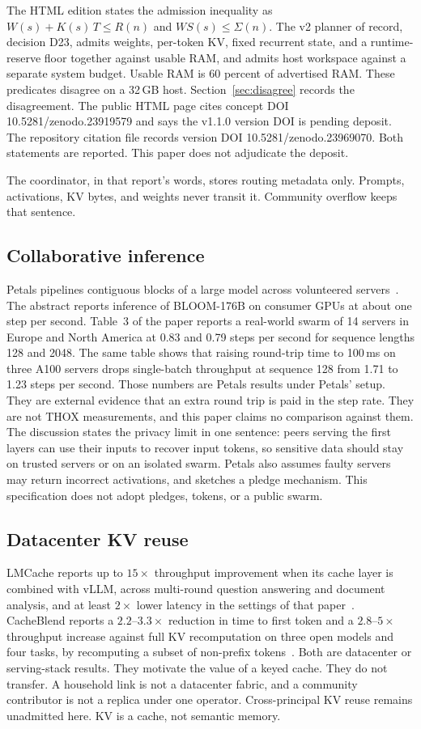 \documentclass[11pt]{article}
\begin{document}
The HTML edition states the admission inequality as \(W(s)+K(s)\,T \le R(n)\) and \(WS(s)\le \Sigma(n)\). The v2 planner of record, decision D23, admits weights, per-token KV, fixed recurrent state, and a runtime-reserve floor together against usable RAM, and admits host workspace against a separate system budget. Usable RAM is 60 percent of advertised RAM. These predicates disagree on a 32\,GB host. Section~\ref{sec:disagree} records the disagreement. The public HTML page cites concept DOI 10.5281/zenodo.23919579 and says the v1.1.0 version DOI is pending deposit. The repository citation file records version DOI 10.5281/zenodo.23969070. Both statements are reported. This paper does not adjudicate the deposit.

The coordinator, in that report's words, stores routing metadata only. Prompts, activations, KV bytes, and weights never transit it. Community overflow keeps that sentence.

\subsection{Collaborative inference}
Petals pipelines contiguous blocks of a large model across volunteered servers~\cite{petals}. The abstract reports inference of BLOOM-176B on consumer GPUs at about one step per second. Table~3 of the paper reports a real-world swarm of 14 servers in Europe and North America at 0.83 and 0.79 steps per second for sequence lengths 128 and 2048. The same table shows that raising round-trip time to 100\,ms on three A100 servers drops single-batch throughput at sequence 128 from 1.71 to 1.23 steps per second. Those numbers are Petals results under Petals' setup. They are external evidence that an extra round trip is paid in the step rate. They are not THOX measurements, and this paper claims no comparison against them. The discussion states the privacy limit in one sentence: peers serving the first layers can use their inputs to recover input tokens, so sensitive data should stay on trusted servers or on an isolated swarm. Petals also assumes faulty servers may return incorrect activations, and sketches a pledge mechanism. This specification does not adopt pledges, tokens, or a public swarm.

\subsection{Datacenter KV reuse}
LMCache reports up to \(15\times\) throughput improvement when its cache layer is combined with vLLM, across multi-round question answering and document analysis, and at least \(2\times\) lower latency in the settings of that paper~\cite{lmcache}. CacheBlend reports a \(2.2\)--\(3.3\times\) reduction in time to first token and a \(2.8\)--\(5\times\) throughput increase against full KV recomputation on three open models and four tasks, by recomputing a subset of non-prefix tokens~\cite{cacheblend}. Both are datacenter or serving-stack results. They motivate the value of a keyed cache. They do not transfer. A household link is not a datacenter fabric, and a community contributor is not a replica under one operator. Cross-principal KV reuse remains unadmitted here. KV is a cache, not semantic memory.
\end{document}
